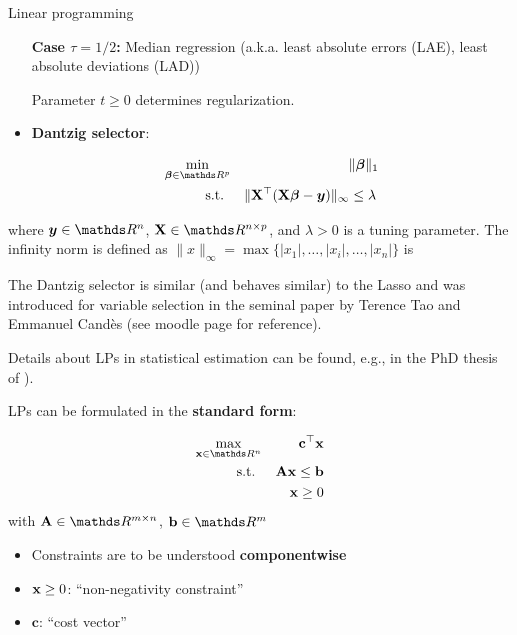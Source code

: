 \documentclass[11pt,compress,t,notes=noshow, xcolor=table]{beamer}
\begin{document}
\begin{vbframe}{Linear programming}
\begin{itemize}
\textbf{Case $\tau = 1/2$:} Median regression (a.k.a. least absolute errors (LAE), least absolute deviations (LAD))

\medskip

Parameter $t \geq 0$ determines regularization.

\item \textbf{Dantzig selector}:

\begin{eqnarray*}
\min_{\bm{\beta}\in \R^p} && \|\bm{\beta}\|_1 \\
\text{s.t. } && \| \Xmat^\top (\Xmat \bm{\beta} - \bm{y})\|_\infty \le \lambda \,
\end{eqnarray*}
\end{itemize}

where $\bm{y} \in \R^n$, $\Xmat \in \R^{n \times p}$, and $\lambda > 0$ is a tuning parameter. The infinity norm is defined as $\| x \|_\infty = \max\{|x_1|, \dots, |x_i|, \ldots, |x_n|\}$ is  

\lz

The Dantzig selector is similar (and behaves similar) to the Lasso and was introduced for variable selection in the seminal paper by Terence Tao and Emmanuel Cand\`es (see moodle page for reference).

\lz

Details about LPs in statistical estimation can be found, e.g., in the PhD thesis of \href{ttps://etd.ohiolink.edu/apexprod/rws_etd/send_file/send?accession=osu1222035715&disposition=inline}{}). 

\framebreak

LPs can be formulated in the \textbf{standard form}:

\vspace*{-0.5cm}

\begin{eqnarray*}
\max_{\xv \in \R^n} && \mathbf{c}^\top\xv\\
\text{s.t. } && \Amat\xv \le \mathbf{b} \\
&& \xv \ge 0
\end{eqnarray*}
with $\Amat \in \R^{m\times n}$, $\mathbf{b} \in \R^m$

\medskip

\begin{itemize}
    \item Constraints are to be understood \textbf{componentwise}
    \item $\mathbf{x} \ge 0$: \enquote{non-negativity constraint}
    \item $\mathbf{c}$: \enquote{cost vector}
\end{itemize}


\end{vbframe}
\end{document}
